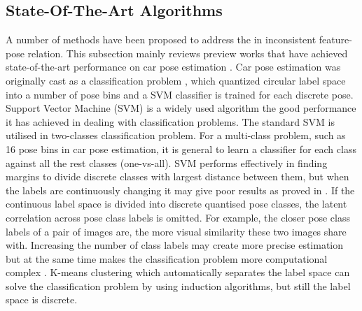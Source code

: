 \documentclass{tutmscthesis}[2010/09/22]
\numberwithin{equation}{section}
\numberwithin{table}{section}
\numberwithin{figure}{section}
\begin{document}
\subsection{State-Of-The-Art Algorithms}

A number of methods have been proposed to address the in inconsistent feature-pose relation. This subsection mainly reviews preview works that have achieved state-of-the-art performance on car pose estimation \cite{ozuysal2009pose, torki2011regression, fenzi2013class, hara2014growing}.
Car pose estimation was originally cast as a classification problem \cite{ozuysal2009pose}, which quantized circular label space into a number of pose bins and a SVM classifier is trained for each discrete pose. 
Support Vector Machine (SVM) \cite{cortes1995support} is a widely used algorithm the good performance it has achieved in dealing with classification problems. 
The standard SVM is utilised in two-classes classification problem. 
For a multi-class problem, such as 16 pose bins in car pose estimation, it is general to learn a classifier for each class against all the rest classes (one-vs-all).  
SVM performs effectively in finding margins to divide discrete classes with largest distance between them, but when the labels are continuously changing it may give poor results as proved in  \cite{guo08icpr}. 
If the continuous label space is divided into discrete quantised pose classes, the latent correlation across pose class labels is omitted. 
For example, the closer pose class labels of a pair of images are, the more visual similarity these two images share with. 
Increasing the number of class labels may create more precise estimation but at the same time makes the classification problem more computational complex \cite{hara2014growing}. 
K-means clustering which automatically separates the label space can solve the classification problem by using induction algorithms, but still the label space is discrete.
\end{document}
